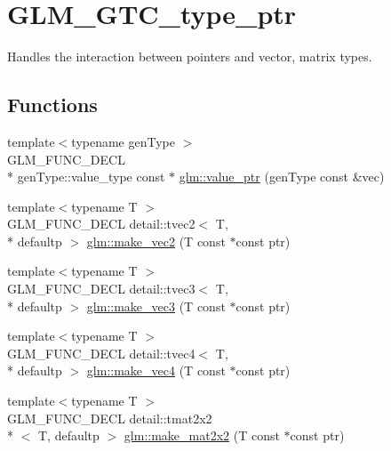 \hypertarget{group__gtc__type__ptr}{\section{G\-L\-M\-\_\-\-G\-T\-C\-\_\-type\-\_\-ptr}
\label{group__gtc__type__ptr}
}


Handles the interaction between pointers and vector, matrix types.  


\subsection*{Functions}
\begin{DoxyCompactItemize}
\item 
{\footnotesize template$<$typename gen\-Type $>$ }\\G\-L\-M\-\_\-\-F\-U\-N\-C\-\_\-\-D\-E\-C\-L \\*
gen\-Type\-::value\-\_\-type const $\ast$ \hyperlink{group__gtc__type__ptr_gaf019636bb8bd7c9efb7c7ce3bb23bcfc}{glm\-::value\-\_\-ptr} (gen\-Type const \&vec)
\item 
{\footnotesize template$<$typename T $>$ }\\G\-L\-M\-\_\-\-F\-U\-N\-C\-\_\-\-D\-E\-C\-L detail\-::tvec2$<$ T, \\*
defaultp $>$ \hyperlink{group__gtc__type__ptr_ga70f570befb4773ba3a658b76f9fdd6ab}{glm\-::make\-\_\-vec2} (T const $\ast$const ptr)
\item 
{\footnotesize template$<$typename T $>$ }\\G\-L\-M\-\_\-\-F\-U\-N\-C\-\_\-\-D\-E\-C\-L detail\-::tvec3$<$ T, \\*
defaultp $>$ \hyperlink{group__gtc__type__ptr_gad91a6a0fe324630b151208703a1591ed}{glm\-::make\-\_\-vec3} (T const $\ast$const ptr)
\item 
{\footnotesize template$<$typename T $>$ }\\G\-L\-M\-\_\-\-F\-U\-N\-C\-\_\-\-D\-E\-C\-L detail\-::tvec4$<$ T, \\*
defaultp $>$ \hyperlink{group__gtc__type__ptr_ga1b9e0d9ca48d79ba87edc121c1872c44}{glm\-::make\-\_\-vec4} (T const $\ast$const ptr)
\item 
{\footnotesize template$<$typename T $>$ }\\G\-L\-M\-\_\-\-F\-U\-N\-C\-\_\-\-D\-E\-C\-L detail\-::tmat2x2\\*
$<$ T, defaultp $>$ \hyperlink{group__gtc__type__ptr_ga860d529f631ea6f9a0e510491d29a8ac}{glm\-::make\-\_\-mat2x2} (T const $\ast$const ptr)

\end{DoxyCompactItemize}
